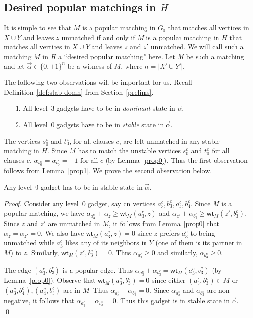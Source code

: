\documentclass{llncs}
\newcommand{\wt}{\mathsf{wt}}
\begin{document}
\subsection{Desired popular matchings in $H$}
It is simple to see that $M$ is a popular matching in $G_0$ that matches all vertices in $X \cup Y$ and leaves $z$ unmatched if and only if
$M$ is a popular matching in $H$ that matches all vertices in $X \cup Y$ and leaves $z$ and $z'$ unmatched.
We will call such a matching $M$ in $H$ a ``desired popular matching'' here. Let $M$ be such a matching and let
$\vec{\alpha} \in\{0,\pm 1\}^n$ be a witness of $M$, where $n = |X'\cup Y'|$.

The following two observations will be important for us. Recall Definition~\ref{def:stab-domn} from Section~\ref{prelims}.

\begin{itemize}
\item[1.] All level~3 gadgets have to be in {\em dominant} state in $\vec{\alpha}$.
\item[2.] All level~0 gadgets have to be in {\em stable} state in $\vec{\alpha}$.
\end{itemize}

  The vertices $s^c_0$ and $t^c_0$, for all clauses $c$, are left unmatched in any stable matching in $H$.
  Since $M$ has to match the unstable vertices $s^c_0$ and $t^c_0$ for all clauses $c$, 
  $\alpha_{s^c_0} = \alpha_{t^c_0} = -1$ for all $c$ (by Lemma~\ref{prop0}). Thus the first observation follows from Lemma~\ref{prop1}. We
  prove the second observation below.
 
 
\begin{claim}
  Any level~0 gadget has to be in stable state in $\vec{\alpha}$.
\end{claim}
\begin{proof}
  Consider any level~0 gadget, say on vertices $a^c_3,b^c_3,a^c_4,b^c_4$. Since $M$ is a popular matching, we have $\alpha_{a^c_3} + \alpha_z \ge \wt_M(a^c_3,z)$ and
  $\alpha_{z'} + \alpha_{b^c_3}  \ge \wt_M(z',b^c_3)$. Since $z$ and $z'$ are unmatched in $M$, it follows from Lemma~\ref{prop0} that $\alpha_{z} = \alpha_{z'} = 0$.
  We also have $\wt_M(a^c_3,z) = 0$ since $z$ prefers $a^c_3$ to being unmatched while  $a^c_3$ likes any of its neighbors in $Y$ (one of them is its partner
  in $M$) to $z$. Similarly, $\wt_M(z',b^c_3) = 0$. Thus $\alpha_{a^c_3} \ge 0$ and similarly, $\alpha_{b^c_3} \ge 0$.

  The edge $(a^c_3,b^c_3)$ is a popular edge. Thus $\alpha_{a^c_3} + \alpha_{b^c_3} = \wt_M(a^c_3,b^c_3)$ (by Lemma~\ref{prop0}). Observe that $\wt_M(a^c_3,b^c_3) = 0$
  since either $(a^c_3,b^c_3) \in M$ or $(a^c_3,b^c_4), (a^c_4,b^c_3)$ are in $M$. Thus $\alpha_{a^c_3} + \alpha_{b^c_3} = 0$.
  Since $\alpha_{a^c_3}$ and  $\alpha_{b^c_3}$ are non-negative, it follows that $\alpha_{a^c_3} = \alpha_{b^c_3} = 0$.
  Thus this gadget is in stable state in $\vec{\alpha}$. \qed
\end{proof}
\end{document}

